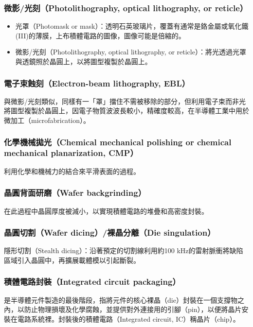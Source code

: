 \documentclass[a4paper,12pt]{report}
\begin{document}
\begin{itemize}
\begin{itemize}
\subsubsection{微影/光刻（Photolithography, optical lithography, or reticle）}
\begin{itemize}
\item 光罩（Photomask or mask）：透明石英玻璃片，覆蓋有通常是鉻金屬或氧化鐵(III)的薄膜，上布積體電路的圖像，圖像可能是倍縮的。
\item 微影/光刻（Photolithography, optical lithography, or reticle）：將光透過光罩與透鏡照於晶圓上，以將圖型複製於晶圓上。
\end{itemize}
\subsubsection{電子束蝕刻（Electron-beam lithography, EBL）}
與微影/光刻類似，同樣有一「罩」擋住不需被移除的部分，但利用電子束而非光將圖型複製於晶圓上，因電子物質波波長較小，精確度較高，在半導體工業中用於微加工（microfabrication）。
\subsubsection{化學機械拋光（Chemical mechanical polishing or chemical mechanical planarization, CMP）}
利用化學和機械力的結合來平滑表面的過程。
\subsubsection{晶圓背面研磨（Wafer backgrinding）}
在此過程中晶圓厚度被減小，以實現積體電路的堆疊和高密度封裝。
\subsubsection{晶圓切割（Wafer dicing）/裸晶分離（Die singulation）}
隱形切割（Stealth dicing）：沿著預定的切割線利用約100 kHz的雷射脈衝將缺陷區域引入晶圓中，再擴展載體模以引起斷裂。
\subsubsection{積體電路封裝（Integrated circuit packaging）}
是半導體元件製造的最後階段，指將元件的核心裸晶（die）封裝在一個支撐物之內，以防止物理損壞及化學腐蝕，並提供對外連接用的引腳（pin），以便將晶片安裝在電路系統裡。封裝後的積體電路（Integrated circuit, IC）稱晶片（chip）。

\end{itemize}
\end{itemize}
\end{document}
